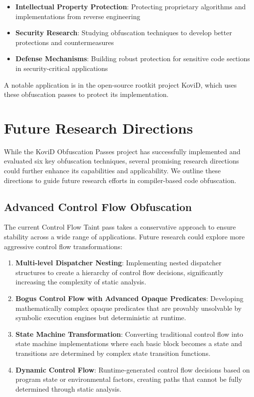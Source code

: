 \documentclass[conference]{IEEEtran}
\begin{document}
\begin{itemize}
    \item \textbf{Intellectual Property Protection}: Protecting proprietary algorithms and implementations from reverse engineering
    \item \textbf{Security Research}: Studying obfuscation techniques to develop better protections and countermeasures
    \item \textbf{Defense Mechanisms}: Building robust protection for sensitive code sections in security-critical applications
\end{itemize}

A notable application is in the open-source rootkit project KoviD, which uses these obfuscation passes to protect its implementation.

\section{Future Research Directions}

While the KoviD Obfuscation Passes project has successfully implemented and evaluated six key obfuscation techniques, several promising research directions could further enhance its capabilities and applicability. We outline these directions to guide future research efforts in compiler-based code obfuscation.

\subsection{Advanced Control Flow Obfuscation}

The current Control Flow Taint pass takes a conservative approach to ensure stability across a wide range of applications. Future research could explore more aggressive control flow transformations:

\begin{enumerate}
    \item \textbf{Multi-level Dispatcher Nesting}: Implementing nested dispatcher structures to create a hierarchy of control flow decisions, significantly increasing the complexity of static analysis.
    
    \item \textbf{Bogus Control Flow with Advanced Opaque Predicates}: Developing mathematically complex opaque predicates that are provably unsolvable by symbolic execution engines but deterministic at runtime.
    
    \item \textbf{State Machine Transformation}: Converting traditional control flow into state machine implementations where each basic block becomes a state and transitions are determined by complex state transition functions.
    
    \item \textbf{Dynamic Control Flow}: Runtime-generated control flow decisions based on program state or environmental factors, creating paths that cannot be fully determined through static analysis.
\end{enumerate}
\end{document}
